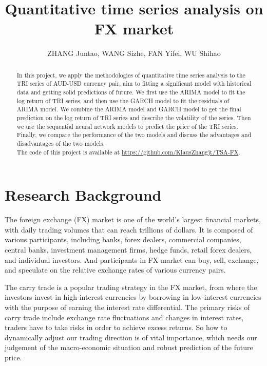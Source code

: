 \documentclass[runningheads]{llncs}
\begin{document}
\title{Quantitative time series analysis on FX market}
\author{ZHANG Juntao, WANG Sizhe, FAN Yifei, WU Shihao}
\maketitle

\begin{abstract}
    In this project, we apply the methodologies of quantitative time series analysis to the TRI series of AUD-USD currency pair, aim to fitting a significant model with historical data and getting solid predictions of future. 
    We first use the ARIMA model to fit the log return of TRI series, and then use the GARCH model to fit the residuals of ARIMA model. 
    We combine the ARIMA model and GARCH model to get the final prediction on the log return of TRI series and describe the volatility of the series. 
    Then we use the sequential neural network models to predict the price of the TRI series. 
    Finally, we compare the performance of the two models and discuss the advantages and disadvantages of the two models.\\
    The code of this project is available at \url{https://github.com/KlausZhangjt/TSA-FX}.
\end{abstract}

\section{Research Background}

The foreign exchange (FX) market is one of the world's largest financial markets, with daily trading volumes that can reach trillions of dollars. It is composed of various participants, including banks, forex dealers, commercial companies, central banks, investment management firms, hedge funds, retail forex dealers, and individual investors. And participants in FX market can buy, sell, exchange, and speculate on the relative exchange rates of various currency pairs.

The carry trade is a popular trading strategy in the FX market, from where the investors invest in high-interest currencies by borrowing in low-interest currencies with the purpose of earning the interest rate differential. The primary risks of carry trade include exchange rate fluctuations and changes in interest rates, traders have to take risks in order to achieve excess returns. So how to dynamically adjust our trading direction is of vital importance, which needs our judgement of the macro-economic situation and robust prediction of the future price.
\end{document}
